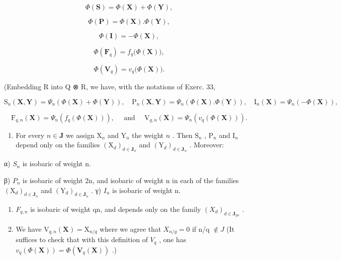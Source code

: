 \[
\Phi (\mathbf {S}) = \Phi (\mathbf {X}) + \Phi (\mathbf {Y}),
\]

\[
\Phi (\mathbf {P}) = \Phi (\mathbf {X}). \Phi (\mathbf {Y}),
\]

\[
\Phi (\mathbf {I}) = - \Phi (\mathbf {X}),
\]

\[
\Phi (\mathbf {F} _ {q}) = f _ {q} \big (\Phi (\mathbf {X}) \big),
\]

\[
\Phi (\mathbf {V} _ {q}) = v _ {q} \bigl (\Phi (\mathbf {X}) \bigr).
\]

(Embedding R into Q ⊗ R, we have, with the notations of Exerc. 33,

\[
\mathrm{S} _ {n} (\mathbf {X}, \mathbf {Y}) = \Psi_ {n} (\Phi (\mathbf {X}) + \Phi (\mathbf {Y})), \quad \mathrm{P} _ {n} (\mathbf {X}, \mathbf {Y}) = \Psi_ {n} (\Phi (\mathbf {X}). \Phi (\mathbf {Y})), \quad \mathrm{I} _ {n} (\mathbf {X}) = \Psi_ {n} (- \Phi (\mathbf {X})),
\]

\[
\mathrm{F} _ {q, n} (\mathbf {X}) = \Psi_ {n} \left(f _ {q} (\Phi (\mathbf {X}))\right), \quad \text { and } \quad \mathrm{V} _ {q, n} (\mathbf {X}) = \Psi_ {n} \left(v _ {q} (\Phi (\mathbf {X}))\right).
\]

\begin{enumerate}
\def\labelenumi{\alph{enumi})}
\setcounter{enumi}{1}
\tightlist
\item
  For every \(n \in \mathbf{J}\) we assign \(\mathrm{X}_{n}\) and \(\mathrm{Y}_{n}\) the weight \(n\) . Then \(\mathrm{S}_{n}\) , \(\mathrm{P}_{n}\) and \(\mathrm{I}_{n}\) depend only on the families \((\mathrm{X}_{d})_{d \in \mathbf{J}_{n}}\) and \((\mathrm{Y}_{d})_{d \in \mathbf{J}_{n}}\) . Moreover:
\end{enumerate}

α) \(S_{n}\) is isobaric of weight n.

β) \(P_{n}\) is isobaric of weight 2n, and isobaric of weight n in each of the families \((\mathrm{X}_{d})_{d\in\mathbf{J}_{n}}\) and \((\mathrm{Y}_{d})_{d\in\mathbf{J}_{n}}\) . γ) \(I_{n}\) is isobaric of weight n.

\begin{enumerate}
\def\labelenumi{\alph{enumi})}
\setcounter{enumi}{2}
\tightlist
\item
  \(F_{q,n}\) is isobaric of weight qn, and depends only on the family \((X_{d})_{d\in\mathbf{J}_{qn}}\) .
\item
  We have \(\mathrm{V}_{q,n}(\mathbf{X}) = \mathrm{X}_{n/q}\) where we agree that \(X_{n/q} = 0\) if n/q \(\notin J\) (It suffices to check that with this definition of \(V_{q}\) , one has \(v_{q}(\Phi(\mathbf{X})) = \Phi(\mathbf{V}_{q}(\mathbf{X}))\) .)
\end{enumerate}


